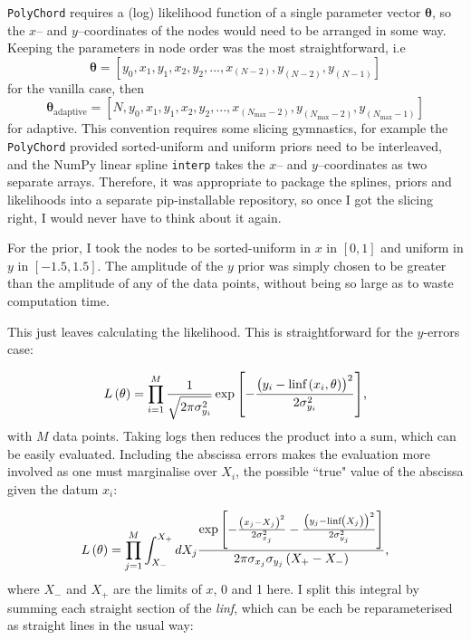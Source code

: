 \documentclass{article}
\begin{document}
\texttt{PolyChord} requires a (log) likelihood function of a single parameter vector $\mathbf{\theta}$, so the $x$-- and $y$--coordinates of the nodes would need to be arranged in some way. Keeping the parameters in node order was the most straightforward, i.e $$\bm\theta = [y_0, x_1, y_1, x_2, y_2, ..., x_{(N-2)}, y_{(N-2)}, y_{(N-1)}]$$for the vanilla case, then $$\bm\theta_\textrm{adaptive} = [N, y_0, x_1, y_1, x_2, y_2, ..., x_{(N_\textrm{max}-2)}, y_{(N_\textrm{max}-2)}, y_{(N_\textrm{max}-1)}]$$ for adaptive. This convention requires some slicing gymnastics, for example the \texttt{PolyChord} provided sorted-uniform and uniform priors need to be interleaved, and the NumPy linear spline \texttt{interp} takes the $x$-- and $y$--coordinates as two separate arrays. Therefore, it was appropriate to package the splines, priors and likelihoods into a separate pip-installable repository, so once I got the slicing right, I would never have to think about it again.

For the prior, I took the nodes to be sorted-uniform in $x$ in $\left[0, 1\right]$ and uniform in $y$ in $\left[-1.5, 1.5\right]$. The amplitude of the $y$ prior was simply chosen to be greater than the amplitude of any of the data points, without being so large as to waste computation time. 

This just leaves calculating the likelihood. This is straightforward for the $y$-errors case:

\begin{equation}
  L\left(\mathbf{\theta}\right) = \prod_{i=1}^{M}\frac{1}{\sqrt{2\pi\sigma_{y_i}^2}}\exp{\left[-\frac{\left(y_i-\textrm{linf}\left(x_i, \mathbf{\theta}\right)\right)^2}{2\sigma_{y_i}^2}\right]}\textrm,
\end{equation}
%
with $M$ data points. Taking logs then reduces the product into a sum, which can be easily evaluated. Including the abscissa errors makes the evaluation more involved as one must marginalise over $X_i$, the possible ``true" value of the abscissa given the datum $x_i$: 

\begin{equation}
  L\left(\mathbf{\theta}\right)= \prod_{j=1}^{M}\int_{X_-}^{X_+}dX_j\frac{\exp{\left[-\frac{\left(x_j-X_j\right)^2}{2\sigma_{x_j}^2} -\frac{\left(y_j-\textrm{linf}\left(X_j\right)\right)^2}{2\sigma_{y_j}^2}\right]}}{2\pi\sigma_{x_j}\sigma_{y_j}\left(X_+-X_-\right)}\textrm,
\end{equation}
%
where $X_-$ and $X_+$ are the limits of $x$, 0 and 1 here. I split this integral by summing each straight section of the \textit{linf}, which can be each be reparameterised as straight lines in the usual way:
\end{document}
